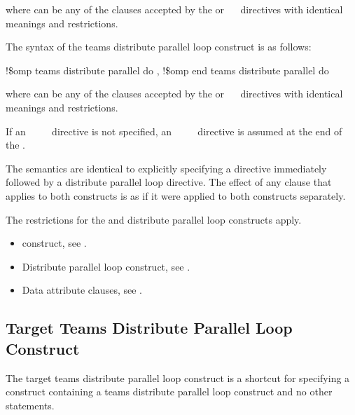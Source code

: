 where  can be any of the clauses accepted by the  or 
~~ directives with identical meanings and restrictions.
\ccppspecificend

\fortranspecificstart
The syntax of the teams distribute parallel loop construct is as follows:

\begin{boxedcode}
!\$omp teams distribute parallel do \plc{[clause[ [},\plc{] clause] ... ]}
\plc{[} !\$omp end teams distribute parallel do \plc{]}
\end{boxedcode}

where  can be any of the clauses accepted by the  or 
~~ directives with identical meanings and restrictions.

If an ~~~~ directive is not specified, an 
~~~~ directive is assumed at the end of the .
\fortranspecificend

\descr
The semantics are identical to explicitly specifying a  directive immediately 
followed by a distribute parallel loop directive. The effect of any clause that applies to 
both constructs is as if it were applied to both constructs separately.

\restrictions
The restrictions for the  and distribute parallel loop constructs apply.

\crossreferences
\begin{itemize}
\item {} construct, see 
.

\item Distribute parallel loop construct, see 
.

\item Data attribute clauses, see 
.
\end{itemize}









\subsection{Target Teams Distribute Parallel Loop Construct}
\label{subsec:Target Teams Distribute Parallel Loop Construct}
\summary
The target teams distribute parallel loop construct is a shortcut for specifying a  
construct containing a teams distribute parallel loop construct and no other statements.

